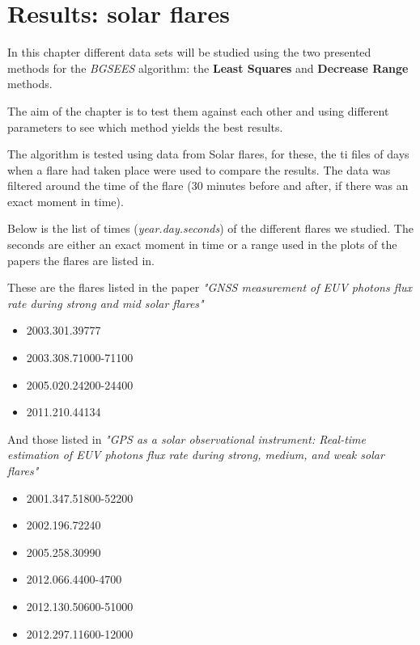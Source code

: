 \chapter{Results: solar flares}

In this chapter different data sets will be studied using the two presented methods for the \textit{BGSEES} algorithm: the \textbf{Least Squares} and \textbf{Decrease Range} methods. 

The aim of the chapter is to test them against each other and using different parameters to see which method yields the best results.

The algorithm is tested using data from Solar flares, for these, the ti files of days when a flare had taken place were used to compare the results. The data was filtered around the time of the flare (30 minutes before and after, if there was an exact moment in time).
 
Below is the list of times (\textit{year.day.seconds}) of the different flares we studied. The seconds are either an exact moment in time or a range used in the plots of the papers the flares are listed in.

These are the flares listed in the paper \textit{"GNSS measurement of EUV photons flux rate during strong and mid solar flares"}\cite{hernandez2012gnss}

\begin{itemize}
	\item 2003.301.39777
	\item 2003.308.71000-71100
	\item 2005.020.24200-24400
	\item 2011.210.44134
\end{itemize}

And those listed in \textit{"GPS as a solar observational instrument: Real-time estimation of EUV photons flux rate during strong, medium, and weak solar flares"}\cite{singh2015gps}

\begin{itemize}
	\item 2001.347.51800-52200
	\item 2002.196.72240
	\item 2005.258.30990
	\item 2012.066.4400-4700
	\item 2012.130.50600-51000
	\item 2012.297.11600-12000
\end{itemize}

